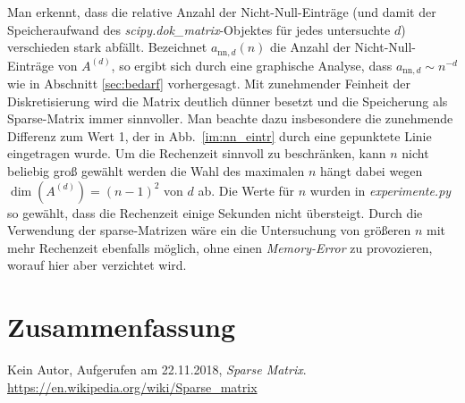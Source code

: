 \documentclass[smallheadings]{scrartcl}
\begin{document}
Man erkennt, dass die relative Anzahl der Nicht-Null-Einträge (und damit der Speicheraufwand des \textit{scipy.dok\_matrix}-Objektes für jedes untersuchte $d$) verschieden stark abfällt. Bezeichnet $a_{\text{nn},d}(n)$ die Anzahl der 
Nicht-Null-Einträge von $A^{(d)}$, so ergibt sich durch eine graphische Analyse, dass $a_{\text{nn},d}\sim n^{-d}$ wie in Abschnitt \ref{sec:bedarf} vorhergesagt. Mit zunehmender Feinheit der Diskretisierung wird die Matrix deutlich dünner besetzt und die Speicherung als Sparse-Matrix immer sinnvoller. Man beachte dazu insbesondere die zunehmende Differenz zum Wert 1, der in Abb.~\ref{im:nn_eintr} durch eine gepunktete Linie eingetragen wurde. 
Um die Rechenzeit sinnvoll zu beschränken, kann $n$ nicht beliebig groß gewählt werden die Wahl des maximalen $n$ hängt dabei wegen $\dim(A^{(d)})=(n-1)^2$ von $d$ ab. Die Werte für $n$ wurden in \textit{experimente.py} so gewählt, dass die Rechenzeit einige Sekunden nicht übersteigt. Durch die Verwendung der sparse-Matrizen wäre ein die Untersuchung von größeren $n$ mit mehr Rechenzeit ebenfalls möglich, ohne einen \textit{Memory-Error} zu provozieren, worauf hier aber verzichtet wird.

\section{Zusammenfassung}




\begin{thebibliography}{9}
 Kein Autor, Aufgerufen am 22.11.2018, \textit{Sparse Matrix}. 
\url{https://en.wikipedia.org/wiki/Sparse_matrix}
\end{thebibliography}


\end{document}
